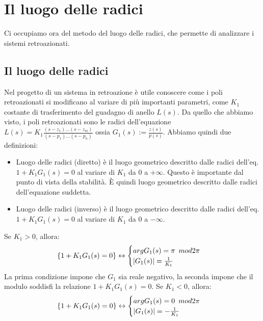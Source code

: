 \documentclass[11pt]{article}
\begin{document}
\section{Il luogo delle radici}
Ci occupiamo ora del metodo del luogo delle radici, che permette di analizzare i sistemi retroazionati.
\subsection{Il luogo delle radici}
Nel progetto di un sistema in retroazione è utile conoscere come i poli retroazionati si modificano al variare di più importanti parametri, come $K_1$ costante di trasferimento del guadagno di anello $L(s)$. Da quello che abbiamo visto, i poli retroazionati sono le radici dell'equazione $L(s)=K_1\frac{(s-z_1)...(s-z_m)}{(s-p_1)...(s-p_n)}$ ossia $G_1(s) := \frac{z(s)}{p(s)}$. Abbiamo quindi due definizioni:
\begin{itemize}
    \item Luogo delle radici (diretto) è il luogo geometrico descritto dalle radici dell'eq. $1+K_1G_1(s)=0$ al variare di $K_1$ da 0 a $+\infty$. Questo è importante dal punto di vista della stabilità.  È quindi luogo geometrico descritto dalle radici dell'equazione suddetta.
    \item Luogo delle radici (inverso) è il luogo geometrico descritto dalle radici dell'eq. $1+K_1G_1(s)=0$ al variare di $K_1$ da 0 a $-\infty$.
\end{itemize}
Se $K_1>0$, allora:
\begin{displaymath}
    \{1+K_1G_1(s)=0\} \leftrightarrow \begin{cases}
        argG_1(s)=\pi\hspace{5px}mod2\pi \\
        |G_1(s)| = \frac{1}{K_1}
    \end{cases}
\end{displaymath}
La prima condizione impone che $G_1$ sia reale negativo, la seconda impone che il modulo soddisfi la relazione $1+K_1G_1(s)=0$.
Se $K_1<0$, allora:
\begin{displaymath}
    \{1+K_1G_1(s)=0\} \leftrightarrow \begin{cases}
        argG_1(s)=0\hspace{5px}mod2\pi \\
        |G_1(s)| = -\frac{1}{K_1}
    \end{cases}
\end{displaymath}
\end{document}
